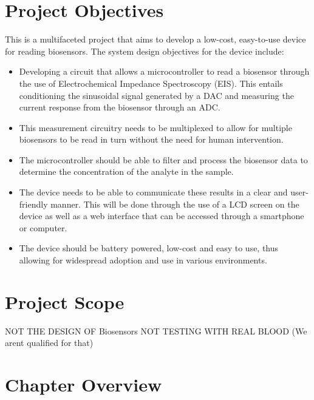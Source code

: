 \section{Project Objectives}
This is a multifaceted project that aims to develop a low-cost, easy-to-use device for reading biosensors. The system design objectives for the device include:
\begin{itemize}
    \item Developing a circuit that allows a microcontroller to read a biosensor through the use of Electrochemical Impedance Spectroscopy (EIS). 
    This entails conditioning the sinusoidal signal generated by a DAC and measuring the current response from the biosensor through an ADC.
    \item This measurement circuitry needs to be multiplexed to allow for multiple biosensors to be read in turn without the need for human intervention.
    \item The microcontroller should be able to filter and process the biosensor data to determine the concentration of the analyte in the sample.
    \item The device needs to be able to communicate these results in a clear and user-friendly manner. 
This will be done through the use of a LCD screen on the device as well as a web interface that can be accessed through a smartphone or computer.
    \item The device should be battery powered, low-cost and easy to use, thus allowing for widespread adoption and use in various environments.
\end{itemize}
\section{Project Scope}
NOT THE DESIGN OF Biosensors
NOT TESTING WITH REAL BLOOD (We arent qualified for that)

\section{Chapter Overview}

